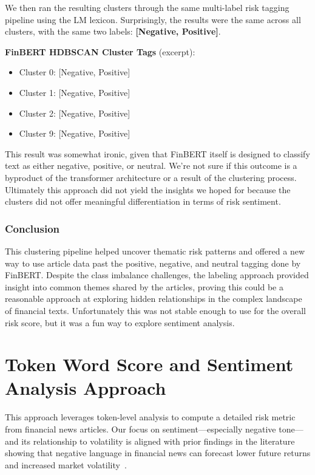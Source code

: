 \documentclass[twocolumn]{article}
\begin{document}
We then ran the resulting clusters through the same multi-label risk tagging pipeline using the LM lexicon. Surprisingly, the results were the same across all clusters, with the same two labels: \textbf{[Negative, Positive]}.

\textbf{FinBERT HDBSCAN Cluster Tags} (excerpt):
\begin{itemize}
    \item Cluster 0: [Negative, Positive]
    \item Cluster 1: [Negative, Positive]
    \item Cluster 2: [Negative, Positive]
    \item Cluster 9: [Negative, Positive]
\end{itemize}

This result was somewhat ironic, given that FinBERT itself is designed to classify text as either negative, positive, or neutral. We're not sure if this outcome is a byproduct of the transformer architecture or a result of the clustering process. Ultimately this approach did not yield the insights we hoped for because the clusters did not offer meaningful differentiation in terms of risk sentiment.

\subsubsection*{Conclusion}

This clustering pipeline helped uncover thematic risk patterns and offered a new way to use article data past the positive, negative, and neutral tagging done by FinBERT. Despite the class imbalance challenges, the labeling approach provided insight into common themes shared by the articles, proving this could be a reasonable approach at exploring hidden relationships in the complex landscape of financial texts. Unfortunately this was not stable enough to use for the overall risk score, but it was a fun way to explore sentiment analysis.

\section{Token Word Score and Sentiment Analysis Approach}
This approach leverages token-level analysis to compute a detailed risk metric from financial news articles. Our focus on sentiment—especially negative tone—and its relationship to volatility is aligned with prior findings in the literature showing that negative language in financial news can forecast lower future returns and increased market volatility~\cite{tetlock2007}.
\end{document}

